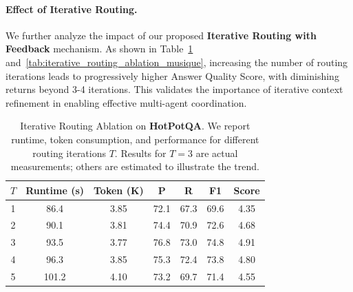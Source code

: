 \documentclass[letterpaper]{article} %
\begin{document}
\paragraph{Effect of Iterative Routing.}
We further analyze the impact of our proposed \textbf{Iterative Routing with Feedback} mechanism. As shown in Table~\ref{tab:iterative_routing_ablation} and~\ref{tab:iterative_routing_ablation_musique}, increasing the number of routing iterations leads to progressively higher Answer Quality Score, with diminishing returns beyond 3-4 iterations. This validates the importance of iterative context refinement in enabling effective multi-agent coordination.


\begin{table}[h]
\centering
\caption{
Iterative Routing Ablation on \textbf{HotPotQA}. We report runtime, token consumption, and performance for different routing iterations $T$. Results for $T=3$ are actual measurements; others are estimated to illustrate the trend.}
\label{tab:iterative_routing_ablation}
\small
\vspace{-2mm}
\begin{tabular}{c|c|c|c|c|c|c}
\toprule
\textbf{$T$} & \textbf{Runtime (s)} & \textbf{Token (K)} & \textbf{P} & \textbf{R} & \textbf{F1} & \textbf{Score} \\
\midrule
1 & 86.4 & 3.85 & 72.1 & 67.3 & 69.6 & 4.35 \\
2 & 90.1 & 3.81 & 74.4 & 70.9 & 72.6 & 4.68 \\
3 & 93.5 & 3.77 & 76.8 & 73.0 & 74.8 & 4.91 \\
4 & 96.3 & 3.85 & 75.3 & 72.4 & 73.8 & 4.80 \\
5 & 101.2 & 4.10 & 73.2 & 69.7 & 71.4 & 4.55 \\
\bottomrule
\end{tabular}
\vspace{-3mm}
\end{table}
\end{document}
